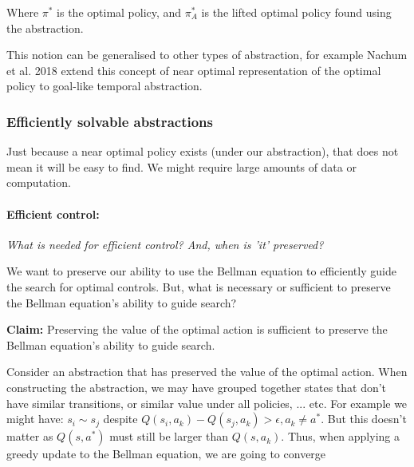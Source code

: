 Where $\pi^{* }$ is the optimal policy, and $\pi_{A}^{* }$ is the lifted optimal
policy found using the abstraction.

This notion can be generalised to other types of abstraction, for example
Nachum et al. 2018 \cite{Nachum2018} extend this concept of near optimal
representation of the optimal policy to goal-like temporal abstraction. \footnotemark[13]


\subsubsection{Efficiently solvable abstractions}

Just because a near optimal policy exists (under our abstraction), that does not mean it will be easy to find.
We might require large amounts of data or computation.

\paragraph{Efficient control:} \label{efficient-control} \textsl{What is needed for efficient control? And, when is 'it' preserved?}

We want to preserve our ability to use the Bellman equation to efficiently guide the search for optimal controls.
But, what is necessary or sufficient to preserve the Bellman equation's ability to guide search?

\begin{displayquote}
\textbf{Claim:} Preserving the value of the optimal action is sufficient to preserve the Bellman equation's ability to guide search.
\end{displayquote}

Consider an abstraction that has preserved the value of the optimal action.
When constructing the abstraction, we may have grouped together states that don't have similar transitions, or similar value under all policies, ... etc.
For example we might have: $s_i \sim s_j$ despite $Q(s_i, a_k) - Q(s_j, a_k) > \epsilon, a_k \neq a^{* }$.
But this doesn't matter as $Q(s, a^{* })$ must still be larger than $Q(s, a_k)$.
Thus, when applying a greedy update to the Bellman equation, we are going to converge
\footnotemark[26]

